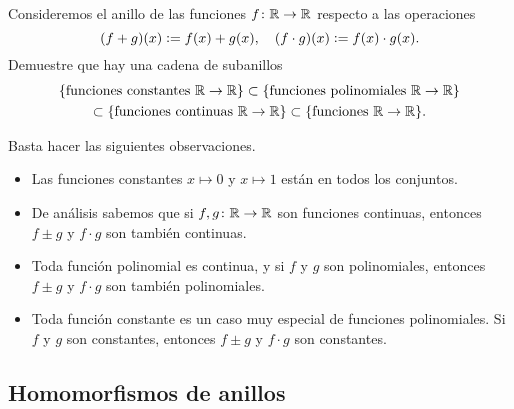 \begin{ejercicio}
  Consideremos el anillo de las funciones $f\colon \mathbb{R}\to\mathbb{R}$ respecto a
  las operaciones 
  \[ (f + g) (x) \mathrel{\mathop:}= f (x) + g (x), \quad
     (f\cdot g) (x) \mathrel{\mathop:}= f (x)\cdot g (x). \]
  Demuestre que hay una cadena de subanillos
  \begin{multline*}
    \{ \text{funciones constantes } \mathbb{R} \to \mathbb{R} \} \subset
    \{ \text{funciones polinomiales } \mathbb{R} \to \mathbb{R} \} \\
    \subset \{ \text{funciones continuas } \mathbb{R} \to \mathbb{R} \} \subset
    \{ \text{funciones } \mathbb{R} \to \mathbb{R} \}.
  \end{multline*}

  \ifdefined\solutions
  \begin{solucion}
    Basta hacer las siguientes observaciones.

    \begin{itemize}
    \item Las funciones constantes $x\mapsto 0$ y $x\mapsto 1$ están en todos
      los conjuntos.

    \item De análisis sabemos que si $f,g\colon \mathbb{R} \to \mathbb{R}$ son funciones
      continuas, entonces $f\pm g$ y $f\cdot g$ son también continuas.

    \item Toda función polinomial es continua, y si $f$ y $g$ son polinomiales,
      entonces $f\pm g$ y $f\cdot g$ son también polinomiales.

    \item Toda función constante es un caso muy especial de funciones
      polinomiales. Si $f$ y $g$ son constantes, entonces $f\pm g$ y $f\cdot g$
      son constantes.
    \end{itemize}
  \end{solucion}
  \fi
\end{ejercicio}

\subsection*{Homomorfismos de anillos}

